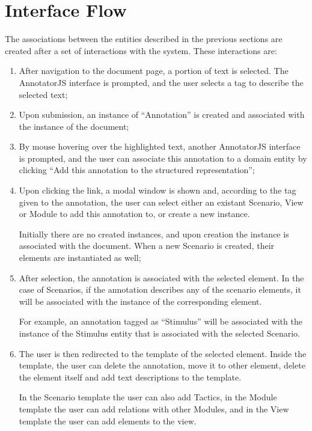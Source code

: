 \section{Interface Flow}
\label{section:interfaceFlow}

The associations between the entities described in the previous sections are created after a set of interactions with the system. These interactions are:

\begin{enumerate}
\item After navigation to the document page, a portion of text is selected. The AnnotatorJS interface is prompted, and the user selects a tag to describe the selected text;

\item Upon submission, an instance of ``Annotation'' is created and associated with the instance of the document;

\item By mouse hovering over the highlighted text, another AnnotatorJS interface is prompted, and the user can associate this annotation to a domain entity by clicking ``Add this annotation to the structured representation'';

\item Upon clicking the link, a modal window is shown and, according to the tag given to the annotation, the user can select either an existant Scenario, View or Module to add this annotation to, or create a new instance. 

Initially there are no created instances, and upon creation the instance is associated with the document. When a new Scenario is created, their elements are instantiated as well;

\item After selection, the annotation is associated with the selected element. In the case of Scenarios, if the annotation describes any of the scenario elements, it will be associated with the instance of the corresponding element. 

For example, an annotation tagged as ``Stimulus'' will be associated with the instance of the Stimulus entity that is associated with the selected Scenario.

\item The user is then redirected to the template of the selected element. Inside the template, the user can delete the annotation, move it to other element, delete the element itself and add text descriptions to the template. 

In the Scenario template the user can also add Tactics, in the Module template the user can add relations with other Modules, and in the View template the user can add elements to the view.
\end{enumerate}

